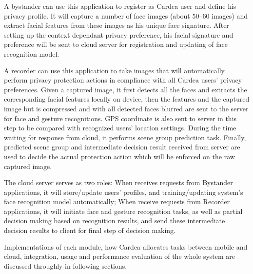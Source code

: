\begin{description}[leftmargin=0cm]
  \item[{\bfseries Bystander client application:}] A bystander can use this application to register as Cardea user and define his privacy profile. It will capture a number of face images (about 50–60 images) and extract facial features from these images as his unique face signature. After setting up the context dependant privacy preference, his facial signature and preference will be sent to cloud server for registration and updating of face recognition model.
  \item[{\bfseries Recorder client application:}] A recorder can use this application to take images that will automatically perform privacy protection actions in compliance with all Cardea users' privacy preferences. Given a captured image, it first detects all the faces and extracts the corresponding facial features locally on device, then the features and the captured image but is compressed and with all detected faces blurred are sent to the server for face and gesture recognitions. GPS coordinate is also sent to server in this step to be compared with recognized users' location settings. During the time waiting for response from cloud, it performs scene group prediction task. Finally, predicted scene group and intermediate decision result received from server are used to decide the actual protection action which will be enforced on the raw captured image.
  \item[{\bfseries Cloud server:}] The cloud server serves as two roles:  When receives requests from Bystander applications, it will store/update users' profiles, and training/updating system's face recognition model automatically;  When receive requests from Recorder applications, it will initiate face and gesture recognition tasks, as well as partial decision making based on recognition results, and send these intermediate decision results to client for final step of decision making.
\end{description}

Implementations of each module, how Cardea allocates tasks between mobile and cloud, integration, usage and performance evaluation of the whole system are discussed throughly in following sections.

